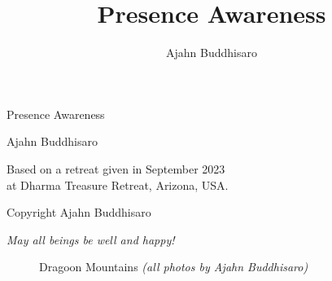 \documentclass[12pt,openany]{book}
\title{Presence Awareness}
\author{Ajahn Buddhisaro}
\date{}
\begin{document}
\frontmatter
\pagestyle{empty}

\begin{center}\end{center}

\vspace{4em}

\begin{center}
{\huge Presence Awareness}

\vspace{4em}

{\Large Ajahn Buddhisaro}
\end{center}

\vspace{16em}
{\small
\noindent Based on a retreat given in September 2023 \\at Dhar\-ma Treasure Retreat, Arizona, USA.

\bigskip

\noindent Copyright Ajahn Buddhisaro
}

\begin{center}
\textit{May all beings be well and happy!}
\end{center}

\vfill

\newpage

\tableofcontents

\mainmatter

\begin{center}\end{center}
\vspace{4em}

\begin{figure}[h]
    \centering
    \caption*{Dragoon Mountains \textit{(all photos by Ajahn Buddhisaro)}}
\end{figure}
\end{document}
